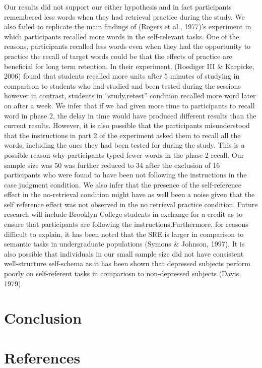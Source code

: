 \documentclass[
  man,floatsintext]{apa6}
\begin{document}
Our results did not support our either hypothesis and in fact participants remembered less words when they had retrieval practice during the study. We also failed to replicate the main findings of (Rogers et al., 1977)'s experiment in which participants recalled more words in the self-relevant tasks. One of the reasons, participants recalled less words even when they had the opportunity to practice the recall of target words could be that the effects of practice are beneficial for long term retention. In their experiment, (Roediger III \& Karpicke, 2006) found that students recalled more units after 5 minutes of studying in comparison to students who had studied and been tested during the sessions however in contrast, students in ``study,retest'' condition recalled more word later on after a week. We infer that if we had given more time to participants to recall word in phase 2, the delay in time would have produced different results than the current results. However, it is also possible that the participants misunderstood that the instructions in part 2 of the experiment asked them to recall all the words, including the ones they had been tested for during the study. This is a possible reason why participants typed fewer words in the phase 2 recall. Our sample size was 50 was further reduced to 34 after the exclusion of 16 participants who were found to have been not following the instructions in the case judgment condition. We also infer that the presence of the self-reference effect in the no-retrieval condition might have as well been a noise given that the self reference effect was not observed in the no retrieval practice condition. Future research will include Brooklyn College students in exchange for a credit as to ensure that participants are following the instructions.Furthermore, for reasons difficult to explain, it has been noted that the SRE is larger in comparison to semantic tasks in undergraduate populations (Symons \& Johnson, 1997). It is also possible that individuals in our small sample size did not have consistent well-structure self-schema as it has been shown that depressed subjects perform poorly on self-referent tasks in compariosn to non-depressed subjects (Davis, 1979).

\hypertarget{conclusion}{%
\section{Conclusion}\label{conclusion}}

\hypertarget{references}{%
\section{References}\label{references}}
\end{document}
